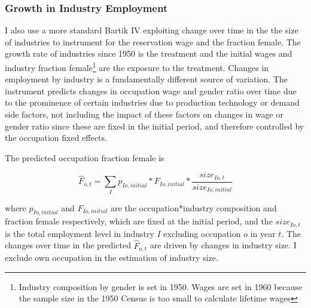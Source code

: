 \documentclass[11pt]{article}
\begin{document}





\subsubsection{Growth in Industry Employment}
I also use a more standard Bartik IV exploiting change over time in the the size of industries to instrument for the reservation wage and the fraction female. The growth rate of industries since 1950 is the treatment and the initial wages and industry fraction female\footnote{Industry composition by gender is set in 1950. Wages are set in 1960 because the sample size in the 1950 Census is too small to calculate lifetime wages} are the exposure to the treatment. Changes in employment by industry is a fundamentally different source of variation. The instrument predicts changes in occupation wage and gender ratio over time due to the prominence of certain industries due to production technology or demand side factors, not including the impact of these factors on changes in wage or gender ratio since these are fixed in the initial period, and therefore controlled by the occupation fixed effects.

The predicted occupation fraction female is

$$\hat{F}_{o,t} = \sum_I p_{Io,initial}*F_{Io,initial}*\frac{size_{Io,t}}{size_{Io,initial}}$$

where $p_{Io,initial}$ and $ F_{Io,initial}$ are the occupation*industry composition and fraction female respectively, which are fixed at the initial period, and the $size_{Io,t}$ is the total employment level in industry $I$ excluding occupation $o$ in year $t$. The changes over time in the predicted $\hat{F}_{o,t}$ are driven by changes in industry size. I exclude own occupation in the estimation of industry size.
\end{document}
